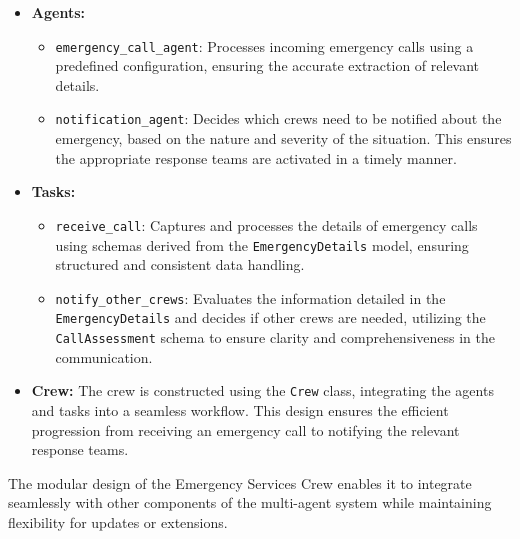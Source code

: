 \begin{itemize}
    \item \textbf{Agents:}
    \begin{itemize}
        \item \texttt{emergency\_call\_agent}: Processes incoming emergency calls using a predefined configuration, ensuring the accurate extraction of relevant details.
        \item \texttt{notification\_agent}: Decides which crews need to be notified about the emergency, based on the nature and severity of the situation. This ensures the appropriate response teams are activated in a timely manner.
    \end{itemize}
    \item \textbf{Tasks:}
    \begin{itemize}
        \item \texttt{receive\_call}: Captures and processes the details of emergency calls using schemas derived from the \texttt{EmergencyDetails} model, ensuring structured and consistent data handling.
        \item \texttt{notify\_other\_crews}: Evaluates the information detailed in the \texttt{EmergencyDetails} and decides if other crews are needed, utilizing the \texttt{CallAssessment} schema to ensure clarity and comprehensiveness in the communication.
    \end{itemize}
    \item \textbf{Crew:}
    The crew is constructed using the \texttt{Crew} class, integrating the agents and tasks into a seamless workflow. This design ensures the efficient progression from receiving an emergency call to notifying the relevant response teams.
\end{itemize}
The modular design of the Emergency Services Crew enables it to integrate seamlessly with other components of the multi-agent system while maintaining flexibility for updates or extensions.